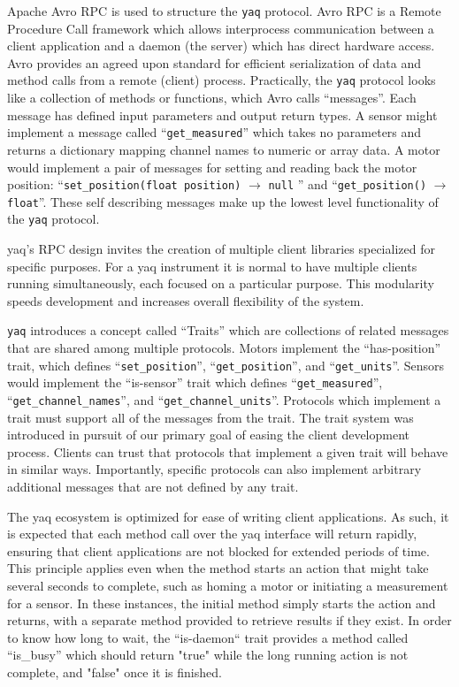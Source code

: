 \documentclass[aip, amsmath, amssymb, reprint,]{revtex4-1}
\newcommand\yaq{\texttt{yaq}}
\begin{document}
Apache Avro RPC \cite{AvroSpecification} is used to structure the \yaq{} protocol.
Avro RPC is a Remote Procedure Call framework which allows interprocess communication between a client application and a daemon (the server) which has direct hardware access.
Avro provides an agreed upon standard for efficient serialization of data and method calls from a remote (client) process.
Practically, the \yaq{} protocol looks like a collection of methods or functions, which Avro calls ``messages''.
Each message has defined input parameters and output return types.
A sensor might implement a message called ``\texttt{get\_measured}'' which takes no parameters and returns a dictionary mapping channel names to numeric or array data.
A motor would implement a pair of messages for setting and reading back the motor position: ``\texttt{set\_position(float position)} $\rightarrow$ \texttt{null} '' and ``\texttt{get\_position()} $\rightarrow$ \texttt{float}''.
These self describing messages make up the lowest level functionality of the \yaq{} protocol.

yaq's RPC design invites the creation of multiple client libraries specialized for specific purposes.
For a yaq instrument it is normal to have multiple clients running simultaneously, each focused on a particular purpose.
This modularity speeds development and increases overall flexibility of the system.


\yaq{} introduces a concept called ``Traits'' which are collections of related messages that are shared among multiple protocols.
Motors implement the ``has-position'' trait, which defines ``\texttt{set\_position}'', ``\texttt{get\_position}'', and ``\texttt{get\_units}''.
Sensors would implement the ``is-sensor'' trait which defines ``\texttt{get\_measured}'', ``\texttt{get\_channel\_names}'', and ``\texttt{get\_channel\_units}''. 
Protocols which implement a trait must support all of the messages from the trait.
The trait system was introduced in pursuit of our primary goal of easing the client development process.
Clients can trust that protocols that implement a given trait will behave in similar ways.
Importantly, specific protocols can also implement arbitrary additional messages that are not defined by any trait.

The yaq ecosystem is optimized for ease of writing client applications.
As such, it is expected that each method call over the yaq interface will return rapidly, ensuring that client applications are not blocked for extended periods of time.
This principle applies even when the method starts an action that might take several seconds to complete, such as homing a motor or initiating a measurement for a sensor.
In these instances, the initial method simply starts the action and returns, with a separate method provided to retrieve results if they exist.
In order to know how long to wait, the ``is-daemon`` trait provides a method called ``is\_busy'' which should return "true" while the long running action is not complete, and "false" once it is finished.
\end{document}
